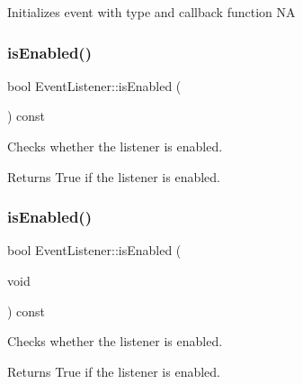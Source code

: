 Initializes event with type and callback function  NA \mbox{\label{classEventListener_a6cf479cbd2b14dcba8f270fb11b38fe5}} 
\subsubsection{\texorpdfstring{is\+Enabled()}{isEnabled()}\hspace{0.1cm}{\footnotesize\ttfamily [1/2]}}
{\footnotesize\ttfamily bool Event\+Listener\+::is\+Enabled (\begin{DoxyParamCaption}{ }\end{DoxyParamCaption}) const\hspace{0.3cm}{\ttfamily [inline]}}

Checks whether the listener is enabled.

\begin{DoxyReturn}{Returns}
True if the listener is enabled. 
\end{DoxyReturn}
\mbox{\label{classEventListener_a6cf479cbd2b14dcba8f270fb11b38fe5}} 
\subsubsection{\texorpdfstring{is\+Enabled()}{isEnabled()}\hspace{0.1cm}{\footnotesize\ttfamily [2/2]}}
{\footnotesize\ttfamily bool Event\+Listener\+::is\+Enabled (\begin{DoxyParamCaption}\item[{void}]{ }\end{DoxyParamCaption}) const\hspace{0.3cm}{\ttfamily [inline]}}

Checks whether the listener is enabled.

\begin{DoxyReturn}{Returns}
True if the listener is enabled. 
\end{DoxyReturn}
\mbox{\label{classEventListener_a4ea8de9a3aec84b0239fe7f4b104f53c}} 
